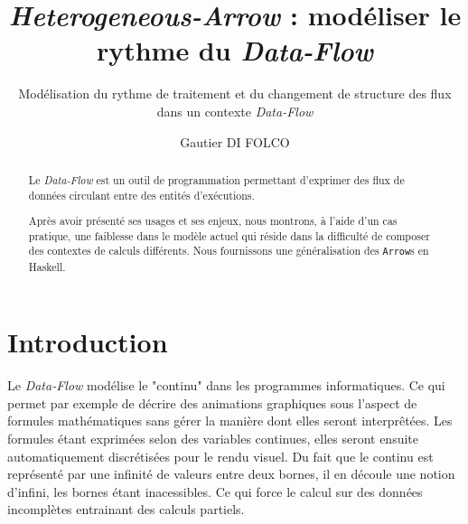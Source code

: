 \documentclass{llncs}
\newcommand{\DF}{\emph{Data-Flow} }
\newcommand{\SA}{\emph{Heterogeneous-Arrow} }
\newcommand{\Arrs}{\lstinline{Arrow}s }
\begin{document}
\title{\SA : modéliser le rythme du \DF}


\subtitle{Modélisation du rythme de traitement et du changement de structure des flux dans un contexte \DF}


\author{Gautier DI FOLCO}







\maketitle

\begin{abstract}
Le \DF est un outil de programmation permettant d'exprimer des flux de
données circulant entre des entités d'exécutions.

Après avoir présenté ses usages et ses enjeux, nous montrons, à l'aide d'un
cas pratique, une faiblesse dans le modèle actuel qui réside dans la difficulté
de composer des contextes de calculs différents.
Nous fournissons une généralisation des \Arrs en Haskell.
\end{abstract}

\section{Introduction}
Le \DF modélise le "continu" dans les programmes informatiques.
Ce qui permet par exemple de décrire des animations graphiques sous l'aspect de
formules mathématiques sans gérer la manière dont elles seront interprêtées.
Les formules étant exprimées selon des variables continues, elles seront ensuite
automatiquement discrétisées pour le rendu visuel.
Du fait que le continu est représenté par une infinité de valeurs entre deux bornes,
il en découle une notion d'infini, les bornes étant inacessibles.
Ce qui force le calcul sur des données incomplètes entrainant des calculs partiels.
\end{document}
